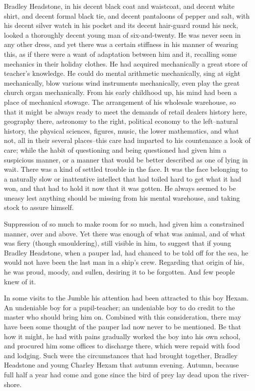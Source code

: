 Bradley Headstone, in his decent black coat and waistcoat, and decent
white shirt, and decent formal black tie, and decent pantaloons of
pepper and salt, with his decent silver watch in his pocket and its
decent hair-guard round his neck, looked a thoroughly decent young man
of six-and-twenty. He was never seen in any other dress, and yet there
was a certain stiffness in his manner of wearing this, as if there were
a want of adaptation between him and it, recalling some mechanics in
their holiday clothes. He had acquired mechanically a great store of
teacher’s knowledge. He could do mental arithmetic mechanically, sing
at sight mechanically, blow various wind instruments mechanically, even
play the great church organ mechanically. From his early childhood up,
his mind had been a place of mechanical stowage. The arrangement of
his wholesale warehouse, so that it might be always ready to meet the
demands of retail dealers history here, geography there, astronomy to
the right, political economy to the left--natural history, the physical
sciences, figures, music, the lower mathematics, and what not, all in
their several places--this care had imparted to his countenance a look
of care; while the habit of questioning and being questioned had given
him a suspicious manner, or a manner that would be better described as
one of lying in wait. There was a kind of settled trouble in the face.
It was the face belonging to a naturally slow or inattentive intellect
that had toiled hard to get what it had won, and that had to hold it now
that it was gotten. He always seemed to be uneasy lest anything should
be missing from his mental warehouse, and taking stock to assure
himself.

Suppression of so much to make room for so much, had given him a
constrained manner, over and above. Yet there was enough of what was
animal, and of what was fiery (though smouldering), still visible in
him, to suggest that if young Bradley Headstone, when a pauper lad, had
chanced to be told off for the sea, he would not have been the last man
in a ship’s crew. Regarding that origin of his, he was proud, moody, and
sullen, desiring it to be forgotten. And few people knew of it.

In some visits to the Jumble his attention had been attracted to this
boy Hexam. An undeniable boy for a pupil-teacher; an undeniable boy
to do credit to the master who should bring him on. Combined with this
consideration, there may have been some thought of the pauper lad now
never to be mentioned. Be that how it might, he had with pains gradually
worked the boy into his own school, and procured him some offices to
discharge there, which were repaid with food and lodging. Such were the
circumstances that had brought together, Bradley Headstone and young
Charley Hexam that autumn evening. Autumn, because full half a year had
come and gone since the bird of prey lay dead upon the river-shore.

